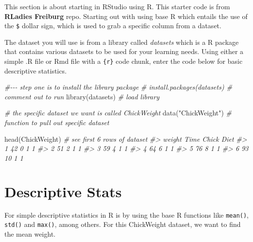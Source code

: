 \documentclass[
]{book}
\newenvironment{Shaded}{\begin{snugshade}}{\end{snugshade}}
\newcommand{\CommentTok}[1]{\textcolor[rgb]{0.56,0.35,0.01}{\textit{#1}}}
\newcommand{\FunctionTok}[1]{\textcolor[rgb]{0.00,0.00,0.00}{#1}}
\newcommand{\NormalTok}[1]{#1}
\newcommand{\StringTok}[1]{\textcolor[rgb]{0.31,0.60,0.02}{#1}}
\theoremstyle{definition}
\theoremstyle{definition}
\theoremstyle{definition}
\theoremstyle{definition}
\theoremstyle{remark}
\begin{document}
This section is about starting in RStudio using R. This starter code is from \textbf{RLadies Freiburg} repo. Starting out with using base R which entails the use of the \texttt{\$} dollar sign, which is used to grab a specific column from a dataset.

The dataset you will use is from a library called \emph{datasets} which is a R package that contains various datasets to be used for your learning needs. Using either a simple .R file or Rmd file with a \texttt{\{r\}} code chunk, enter the code below for basic descriptive statistics.

\begin{Shaded}
\begin{Highlighting}[]
\CommentTok{\#{-}{-}{-} step one is to install the library package}
\CommentTok{\# install.packages(\textquotesingle{}datasets\textquotesingle{})    \# comment out to run}
\FunctionTok{library}\NormalTok{(datasets)                 }\CommentTok{\# load library}

\CommentTok{\# the specific dataset we want is called ChickWeight}
\FunctionTok{data}\NormalTok{(}\StringTok{"ChickWeight"}\NormalTok{)               }\CommentTok{\# function to pull out specific dataset}

\FunctionTok{head}\NormalTok{(ChickWeight)                 }\CommentTok{\# see first 6 rows of dataset}
\CommentTok{\#\textgreater{}   weight Time Chick Diet}
\CommentTok{\#\textgreater{} 1     42    0     1    1}
\CommentTok{\#\textgreater{} 2     51    2     1    1}
\CommentTok{\#\textgreater{} 3     59    4     1    1}
\CommentTok{\#\textgreater{} 4     64    6     1    1}
\CommentTok{\#\textgreater{} 5     76    8     1    1}
\CommentTok{\#\textgreater{} 6     93   10     1    1}
\end{Highlighting}
\end{Shaded}

\hypertarget{descriptive-stats}{%
\section{Descriptive Stats}\label{descriptive-stats}}

For simple descriptive statistics in R is by using the base R functions like \texttt{mean()}, \texttt{std()} and \texttt{max()}, among others. For this ChickWeight dataset, we want to find the mean weight.
\end{document}
